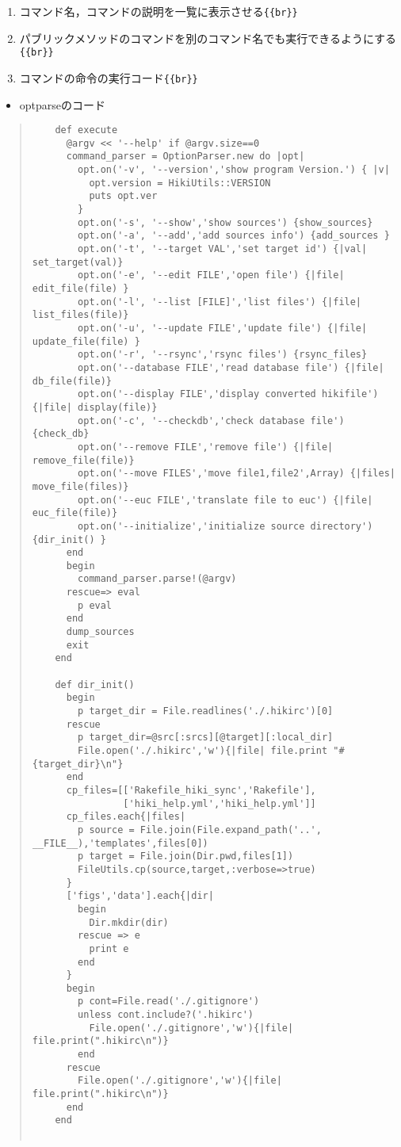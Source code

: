 \documentclass[10pt,a4j]{article}
\begin{document}
\begin{enumerate}
\item コマンド名，コマンドの説明を一覧に表示させる\verb|{{br}}|
\item パブリックメソッドのコマンドを別のコマンド名でも実行できるようにする\verb|{{br}}|
\item コマンドの命令の実行コード\verb|{{br}}|
\end{enumerate}
\begin{itemize}
\item optparseのコード
\end{itemize}\begin{quote}\begin{verbatim}
    def execute
      @argv << '--help' if @argv.size==0
      command_parser = OptionParser.new do |opt|
        opt.on('-v', '--version','show program Version.') { |v|
          opt.version = HikiUtils::VERSION
          puts opt.ver
        }
        opt.on('-s', '--show','show sources') {show_sources}
        opt.on('-a', '--add','add sources info') {add_sources }
        opt.on('-t', '--target VAL','set target id') {|val| set_target(val)}
        opt.on('-e', '--edit FILE','open file') {|file| edit_file(file) }
        opt.on('-l', '--list [FILE]','list files') {|file| list_files(file)}
        opt.on('-u', '--update FILE','update file') {|file| update_file(file) }
        opt.on('-r', '--rsync','rsync files') {rsync_files}
        opt.on('--database FILE','read database file') {|file| db_file(file)}
        opt.on('--display FILE','display converted hikifile') {|file| display(file)}
        opt.on('-c', '--checkdb','check database file') {check_db}
        opt.on('--remove FILE','remove file') {|file| remove_file(file)}
        opt.on('--move FILES','move file1,file2',Array) {|files| move_file(files)}
        opt.on('--euc FILE','translate file to euc') {|file| euc_file(file)}
        opt.on('--initialize','initialize source directory') {dir_init() }
      end
      begin
        command_parser.parse!(@argv)
      rescue=> eval
        p eval
      end
      dump_sources
      exit
    end    
    
    def dir_init()
      begin
        p target_dir = File.readlines('./.hikirc')[0]
      rescue
        p target_dir=@src[:srcs][@target][:local_dir]
        File.open('./.hikirc','w'){|file| file.print "#{target_dir}\n"}
      end
      cp_files=[['Rakefile_hiki_sync','Rakefile'],
                ['hiki_help.yml','hiki_help.yml']]
      cp_files.each{|files|
        p source = File.join(File.expand_path('..', __FILE__),'templates',files[0])
        p target = File.join(Dir.pwd,files[1])
        FileUtils.cp(source,target,:verbose=>true)
      }
      ['figs','data'].each{|dir|
        begin
          Dir.mkdir(dir)
        rescue => e
          print e
        end
      }
      begin
        p cont=File.read('./.gitignore')
        unless cont.include?('.hikirc')
          File.open('./.gitignore','w'){|file| file.print(".hikirc\n")}
        end
      rescue
        File.open('./.gitignore','w'){|file| file.print(".hikirc\n")}
      end
    end


\end{verbatim}
\end{quote}
\end{document}

